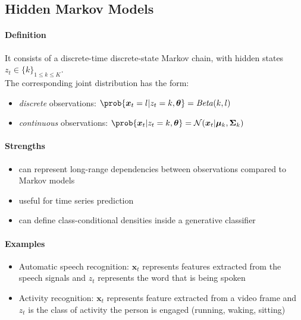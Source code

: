 \subsection{Hidden Markov Models}
\paragraph{Definition}
It consists of a discrete-time discrete-state Markov chain, with hidden states $z_{t}\in\{k\}_{1\leq
k\leq K}$.\\
The corresponding joint distribution has the form:
\begin{center}
\end{center}


\begin{itemize}
    \item \emph{discrete} observations: $\prob{\bm{x}_{t}=l|z_{t}=k,\bm{\theta}} = \text{\emph{Beta}}
        (k,l)$
    \item \emph{continuous} observations: $\prob{\bm{x}_{t}|z_{t}=k,\bm{\theta}} = \mathcal{N}(\bm{x}
        _{t}|\bm{\mu}_{k},\bm{\Sigma}_{k})$
\end{itemize}

\paragraph{Strengths}
\begin{itemize}
    \item can represent long-range dependencies between observations compared to Markov models
    \item useful for time series prediction
    \item can define class-conditional densities inside a generative classifier
\end{itemize}

\paragraph{Examples}
\begin{itemize}
    \item Automatic speech recognition: $\bm{x}_{t}$ represents features extracted from the speech 
        signals and $z_{t}$ represents the word that is being spoken
    \item Activity recognition: $\bm{x}_{t}$ represents feature extracted from a video frame and 
        $z_{t}$ is the class of activity the person is engaged (running, waking, sitting)
\end{itemize}

